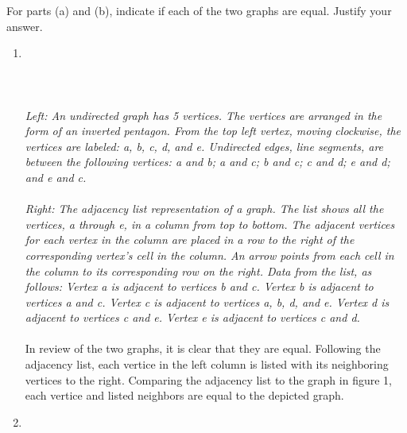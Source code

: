 \documentclass{amsart}
\theoremstyle{definition}
\theoremstyle{Exercise}
\theoremstyle{remark}
\theoremstyle{rule}
\numberwithin{equation}{section}
\begin{document}
For parts (a) and (b), indicate if each of the two graphs are equal. Justify your answer.\\
 \begin{enumerate}[label=(\alph*)]
 

  \item
\hfil
\\\\
\\\\
 {\color{blue}{\bf Figure 1:} \emph{Left: An undirected graph has 5 vertices. The vertices are arranged in the form of an inverted pentagon. From the top left vertex, moving clockwise, the vertices are labeled: a, b, c, d, and e. Undirected edges, line segments, are between the following vertices: a and b; a and c; b and c; c and d; e and d; and e and c. \\
 }
 }\\
{\color{blue}{\bf Figure 2:} \emph{
  Right: The adjacency list representation of a graph. The list shows all the vertices, a through e, in a column from top to bottom. The adjacent vertices for each vertex in the column are placed in a row to the right of the corresponding vertex’s cell in the column. An arrow points from each cell in the column to its corresponding row on the right. Data from the list, as follows: Vertex a is adjacent to vertices b and c. Vertex b is adjacent to vertices a and c. Vertex c is adjacent to vertices a, b, d, and e. Vertex d is adjacent to vertices c and e. Vertex e is adjacent to vertices c and d.
}
}
\\\\
In review of the two graphs, it is clear that they are equal. Following the adjacency list, each vertice in the left column is listed with its neighboring vertices to the right.
Comparing the adjacency list to the graph in figure 1, each vertice and listed neighbors are equal to the depicted graph.\\
\newpage
\vspace*{0.2in}
 \item
\hfil
\end{enumerate}
\end{document}
